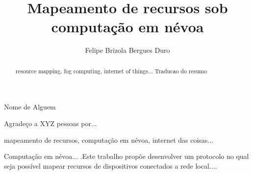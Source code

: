 \documentclass[portuguese,oneside]{tcc}
\author{Felipe Brizola Bergues Duro}
\title{Mapeamento de recursos sob computação em névoa}
        {Mapping resources under the fog computing}
\begin{document}
  
  
           {Nome de Alguem}
  
  
    \begin{agradecimentos}
  Agradeço a XYZ pessoas por...  \end{agradecimentos}
  
  \begin{resumo}{mapeamento de recursos, computação em névoa, internet das coisas...}
  
  Computação em névoa... .Este trabalho propõe desenvolver um protocolo no qual seja possível mapear recursos de dispositivos conectados a rede local....
  
  \end{resumo}
  
  \begin{abstract}{resource mapping, fog computing, internet of things...}
  Traducao do resumo\end{abstract}
  
  \listoffigures       %
  \listofalgorithms    %
  \listofacronyms      %
  \tableofcontents     %
  
\end{document}
